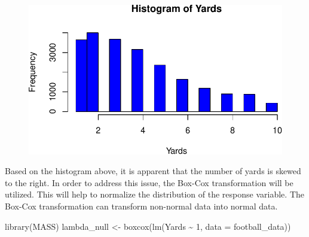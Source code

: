 \documentclass[
  super,
  preprint,
  3p]{elsarticle}
\newenvironment{Shaded}{\begin{snugshade}}{\end{snugshade}}
\newcommand{\AttributeTok}[1]{\textcolor[rgb]{0.40,0.45,0.13}{#1}}
\newcommand{\CommentTok}[1]{\textcolor[rgb]{0.37,0.37,0.37}{#1}}
\newcommand{\DecValTok}[1]{\textcolor[rgb]{0.68,0.00,0.00}{#1}}
\newcommand{\FunctionTok}[1]{\textcolor[rgb]{0.28,0.35,0.67}{#1}}
\newcommand{\NormalTok}[1]{\textcolor[rgb]{0.00,0.23,0.31}{#1}}
\newcommand{\OtherTok}[1]{\textcolor[rgb]{0.00,0.23,0.31}{#1}}
\newcommand{\SpecialCharTok}[1]{\textcolor[rgb]{0.37,0.37,0.37}{#1}}
\newcommand{\StringTok}[1]{\textcolor[rgb]{0.13,0.47,0.30}{#1}}
\begin{document}
\begin{Shaded}
\end{Shaded}

\begin{figure}[H]

{\centering \includegraphics{project_report_files/figure-pdf/unnamed-chunk-3-1.pdf}

}

\end{figure}

Based on the histogram above, it is apparent that the number of yards is
skewed to the right. In order to address this issue, the Box-Cox
transformation will be utilized. This will help to normalize the
distribution of the response variable. The Box-Cox transformation can
transform non-normal data into normal data.

\begin{Shaded}
\begin{Highlighting}[]
\FunctionTok{library}\NormalTok{(MASS)}
\NormalTok{lambda\_null }\OtherTok{\textless{}{-}} \FunctionTok{boxcox}\NormalTok{(}\FunctionTok{lm}\NormalTok{(Yards }\SpecialCharTok{\textasciitilde{}} \DecValTok{1}\NormalTok{, }\AttributeTok{data =}\NormalTok{ football\_data))}
\end{Highlighting}
\end{Shaded}
\end{document}
